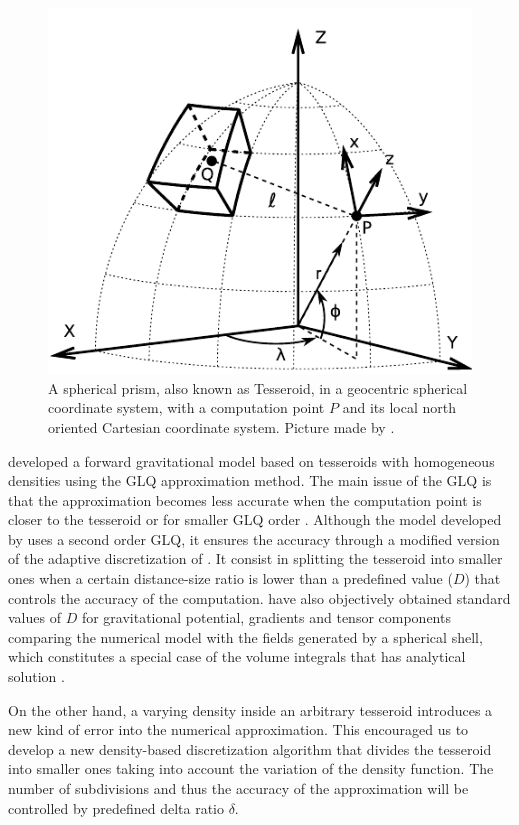 \documentclass[extra]{gji}
\begin{document}
\begin{figure}
\centering
\includegraphics[width=0.9\linewidth]{figures/tesseroid-uieda.pdf}
\caption{
    A spherical prism, also known as  Tesseroid, in a geocentric spherical 
    coordinate system, with a computation point $P$ and its local north 
    oriented Cartesian coordinate system. Picture made by \citet{Uieda2015}.
}
\label{fig:tesseroid-uieda}
\end{figure}

\citet{Uieda2016} developed a forward gravitational model based on 
tesseroids with homogeneous densities using the GLQ approximation 
method.
The main issue of the GLQ is that the approximation becomes less 
accurate when the computation point is closer to the tesseroid or for 
smaller GLQ order \citep{Ku1977}.
Although the model developed by \citet{Uieda2016} uses a second order GLQ, it 
ensures the accuracy through a modified version of the adaptive 
discretization of \citet{Li2011}.
It consist in splitting the tesseroid into smaller ones when a certain 
distance-size ratio is lower than a predefined value ($D$) that controls the 
accuracy of the computation.
\citet{Uieda2016} have also objectively obtained standard values of $D$ 
for gravitational potential, gradients and tensor components comparing 
the numerical model with the fields generated by a spherical shell, 
which constitutes a special case of the volume integrals that has 
analytical solution \citep{LaFehr1991, Mikuska2006, Grombein2013}.

On the other hand, a varying density inside an arbitrary tesseroid 
introduces a new kind of error into the numerical approximation.
This encouraged us to develop a new density-based discretization 
algorithm that divides the tesseroid into smaller ones taking into 
account the variation of the density function.
The number of subdivisions and thus the accuracy of the approximation 
will be controlled by predefined delta ratio $\delta$.
\end{document}
